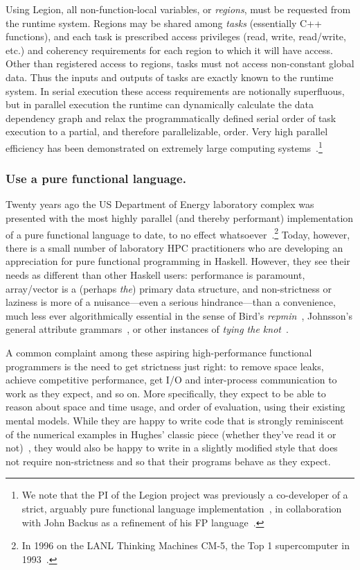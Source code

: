\documentclass{llncs}
\begin{document}
Using Legion, all non-function-local variables, or \emph{regions}, must be
requested from the runtime system.  Regions may be shared among \emph{tasks}
(essentially C++ functions), and each task is prescribed access privileges
(read, write, read/write, etc.) and coherency requirements for each region to
which it will have access.  Other than registered access to regions, tasks
must not access non-constant global data.  Thus the inputs and outputs of
tasks are exactly known to the runtime system.  In serial execution these
access requirements are notionally superfluous, but in parallel execution the
runtime can dynamically calculate the data dependency graph and relax the
programmatically defined serial order of task execution to a partial, and
therefore parallelizable, order.  Very high parallel efficiency has been
demonstrated on extremely large computing systems~\cite{Bauer14}.\footnote{We
  note that the PI of the Legion project was previously a co-developer of a
  strict, arguably pure functional language
  implementation~\cite{AikenFL,FLreport89}, in collaboration with John Backus
  as a refinement of his FP language~\cite{Backus:1978}.}

\subsubsection{Use a pure functional language.}
Twenty years ago the US Department of Energy laboratory complex was
presented with the most highly parallel (and thereby performant)
implementation of a pure functional language to date, to no
effect whatsoever~\cite{Davis96}.\footnote{In 1996 on the LANL Thinking Machines
CM-5, the Top 1 supercomputer in 1993~\cite{top1:1993}.}
Today, however, there is a small number of laboratory HPC practitioners
who are developing an appreciation for pure functional programming in Haskell.
However, they see their needs as different than other Haskell users: performance
is paramount, array/vector
is a (perhaps \emph{the}) primary data
structure, and non-strictness or laziness is more of a nuisance---even a
serious hindrance---than a convenience, much less ever algorithmically
essential in the sense of Bird's \emph{repmin}~\cite{Bird84},
Johnsson's general attribute grammars~\cite{Johnsson87}, 
or other instances of \emph{tying the knot}~\cite{tying-the-knot}.

A common complaint among these aspiring high-performance functional
programmers is the need to get strictness just right: to remove space leaks,
achieve competitive performance, get I/O and inter-process communication to work
as they expect, and so on.  More specifically, they expect to be able to
reason about space and time usage, and order of evaluation, using their
existing mental models. While they are happy to write code that is strongly
reminiscent of the numerical examples in Hughes' classic piece (whether
they've read it or not)~\cite{Hughes89}, they would also be happy to write in
a slightly modified style that does not require non-strictness 
%
and so that their programs behave as they expect.
\end{document}
